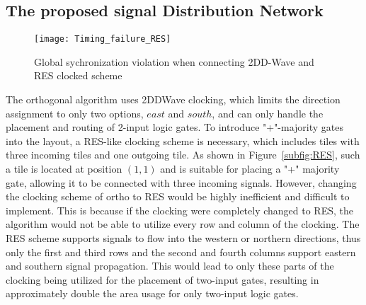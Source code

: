 \subsection{The proposed signal Distribution Network}

\begin{figure}
	\centering
	\texttt{[image: Timing\_failure\_RES]}
	\caption{Global sychronization violation when connecting 2DD-Wave and RES clocked scheme}\label{fig:Timing_failure_RES}
\end{figure}

The orthogonal algorithm uses 2DDWave clocking, which limits the direction assignment to only two options, $east$ and $south$, and can only handle the placement and routing of 2-input logic gates. To introduce "+"-majority gates into the layout, a RES-like clocking scheme is necessary, which includes tiles with three incoming tiles and one outgoing tile. As shown in Figure~\ref{subfig:RES}, such a tile is located at position $(1, 1)$ and is suitable for placing a "+" majority gate, allowing it to be connected with three incoming signals. However, changing the clocking scheme of ortho to RES would be highly inefficient and difficult to implement. This is because if the clocking were completely changed to RES, the algorithm would not be able to utilize every row and column of the clocking. The RES scheme supports signals to flow into the western or northern directions, thus only the first and third rows and the second and fourth columns support eastern and southern signal propagation. This would lead to only these parts of the clocking being utilized for the placement of two-input gates, resulting in approximately double the area usage for only two-input logic gates.
